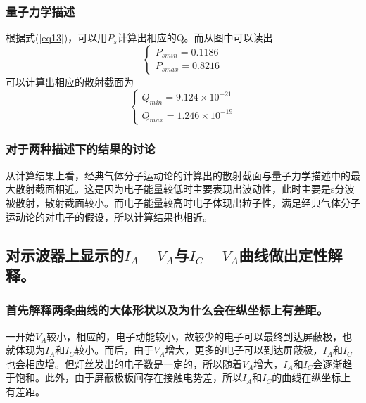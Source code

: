 \documentclass[a4paper]{article}
\begin{document}
\subsubsection{量子力学描述}
根据式(\ref{eq13})，可以用$P_s$计算出相应的Q。而从图中可以读出
\begin{equation*}
\begin{cases}
P_{smin} = 0.1186\\
P_{smax} = 0.8216
\end{cases}
\end{equation*}
可以计算出相应的散射截面为
\begin{equation*}
\begin{cases}
Q_{min} = 9.124\times 10^{-21}\\
Q_{max} = 1.246\times 10^{-19}
\end{cases}
\end{equation*}
\subsubsection{对于两种描述下的结果的讨论}
从计算结果上看，经典气体分子运动论的计算出的散射截面与量子力学描述中的最大散射截面相近。这是因为电子能量较低时主要表现出波动性，此时主要是s分波被散射，散射截面较小。而电子能量较高时电子体现出粒子性，满足经典气体分子运动论的对电子的假设，所以计算结果也相近。
\subsection{对示波器上显示的$I_A-V_A$与$I_C-V_A$曲线做出定性解释。}
\subsubsection{首先解释两条曲线的大体形状以及为什么会在纵坐标上有差距。}
一开始$V_A$较小，相应的，电子动能较小，故较少的电子可以最终到达屏蔽极，也就体现为$I_A$和$I_C$较小。而后，由于$V_A$增大，更多的电子可以到达屏蔽极，$I_A$和$I_C$也会相应增。但灯丝发出的电子数是一定的，所以随着$V_A$增大，$I_A$和$I_C$会逐渐趋于饱和。此外，由于屏蔽极板间存在接触电势差，所以$I_A$和$I_C$的曲线在纵坐标上有差距。
\end{document}
